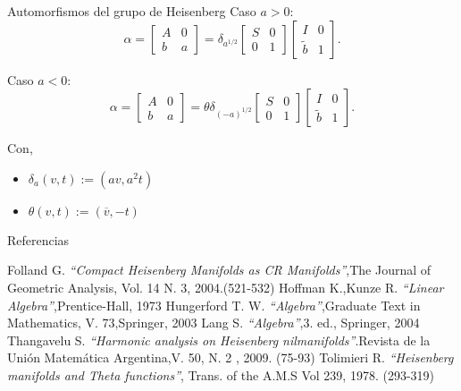 \documentclass{beamer}
\begin{document}
\begin{frame}{Automorfismos del grupo de Heisenberg}
Caso $a>0$:
 $$\alpha=
 \begin{bmatrix}
A & 0\\
b & a
\end{bmatrix}=
\delta_{a^{1/2}}
\begin{bmatrix}
S & 0\\
0 & 1
\end{bmatrix}
\begin{bmatrix}
I & 0\\
\tilde{b} & 1
\end{bmatrix}.
$$

Caso $a<0$:
$$\alpha=
 \begin{bmatrix}
A & 0\\
b & a
\end{bmatrix}=
\theta
\delta_{(-a)^{1/2}}
\begin{bmatrix}
S & 0\\
0 & 1
\end{bmatrix}
\begin{bmatrix}
I & 0\\
\tilde{b} & 1
\end{bmatrix}.
$$

Con, 
\begin{itemize}
\item $\delta_a (v,t) :=(a v,a^2 t)$
\item $\theta(v,t):=(\overline{v},-t)$
\end{itemize}
\end{frame}



 \begin{frame}{Referencias}
  \begin{thebibliography}{1}
   Folland G.  \emph{``Compact Heisenberg Manifolds as CR Manifolds''},The Journal of Geometric Analysis, Vol. 14 N. 3, 2004.(521-532)
   Hoffman K.,Kunze R.  \emph{``Linear Algebra''},Prentice-Hall, 1973  
   Hungerford T. W.  \emph{``Algebra''},Graduate Text in Mathematics, V. 73,Springer, 2003
   Lang S.  \emph{``Algebra''},3. ed., Springer, 2004
   Thangavelu S.  \emph{``Harmonic analysis on Heisenberg nilmanifolds''}.Revista de la Unión Matemática Argentina,V. 50, N. 2 , 2009. (75-93)
   Tolimieri R.   \emph{``Heisenberg manifolds and Theta functions''}, Trans. of the A.M.S Vol 239, 1978. (293-319)  
  \end{thebibliography}
\end{frame}
\end{document}
